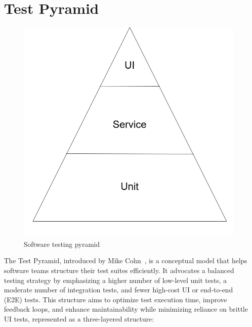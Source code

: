 \documentclass[
	msc, %
	english %
]{../ppgccufmg}
\begin{document}
        \section{Test Pyramid}\label{sec:ch2-test-pyramid}

        \begin{figure}[h]
            \centering
            \includegraphics[scale=0.45]{img/test_pyramid.png}
            \caption{Software testing pyramid}\label{fig:test_pyramid}
        \end{figure}

        The Test Pyramid, introduced by Mike Cohn~\cite{Cohn09}, is a conceptual model that helps software teams structure their test suites efficiently. It advocates a balanced testing strategy by emphasizing a higher number of low-level unit tests, a moderate number of integration tests, and fewer high-cost UI or end-to-end (E2E) tests. This structure aims to optimize test execution time, improve feedback loops, and enhance maintainability while minimizing reliance on brittle UI tests, represented as a three-layered structure:
\end{document}
